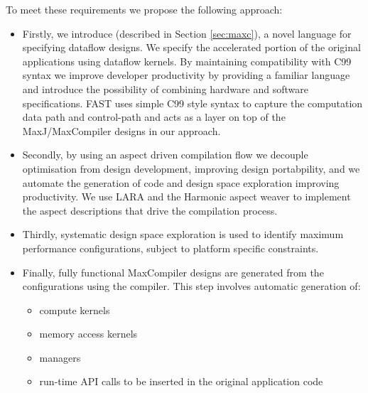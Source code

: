 To meet these requirements we propose the following approach:
\begin{itemize}
\item Firstly, we introduce \FAST{} (described in Section
  \ref{sec:maxc}), a novel language for specifying dataflow
  designs. We specify the accelerated portion of the original
  applications using \FAST{} dataflow kernels. By maintaining
  compatibility with C99 syntax we improve developer productivity by
  providing a familiar language and introduce the possibility of
  combining hardware and software specifications.  FAST uses simple
  C99 style syntax to capture the computation data path and
  control-path and acts as a layer on top of the MaxJ/MaxCompiler
  designs in our approach.

\item Secondly, by using an aspect driven compilation flow we decouple
  optimisation from design development, improving design portabpility,
  and we automate the generation of code and design space exploration
  improving productivity. We use LARA and the Harmonic aspect weaver
  to implement the aspect descriptions that drive the compilation
  process.


\item Thirdly, systematic design space exploration is used to identify
  maximum performance configurations, subject to platform specific
  constraints.

\item Finally, fully functional MaxCompiler designs are generated from
  the configurations using the \fastc{} compiler. This step involves
  automatic generation of:
\begin{itemize}
\item compute kernels
\item memory access kernels
\item managers
\item run-time API calls to be inserted in the original application code
\end{itemize}
\end{itemize}

